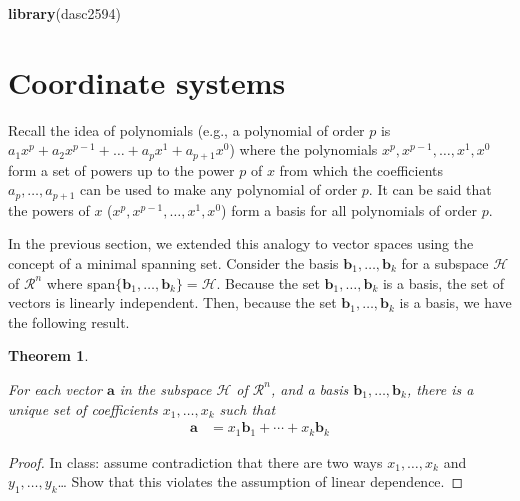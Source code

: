 \documentclass[
]{book}
\newenvironment{Shaded}{\begin{snugshade}}{\end{snugshade}}
\newcommand{\KeywordTok}[1]{\textcolor[rgb]{0.13,0.29,0.53}{\textbf{#1}}}
\newcommand{\NormalTok}[1]{#1}
\newtheorem{theorem}{Theorem}[chapter]
\theoremstyle{definition}
\theoremstyle{definition}
\theoremstyle{definition}
\theoremstyle{remark}
\begin{document}
\begin{Shaded}
\begin{Highlighting}[]
\KeywordTok{library}\NormalTok{(dasc2594)}
\end{Highlighting}
\end{Shaded}

\hypertarget{coordinate-systems}{%
\section{Coordinate systems}\label{coordinate-systems}}

Recall the idea of polynomials (e.g., a polynomial of order \(p\) is \(a_1x^p + a_2x^{p-1} + \ldots + a_p x^1 + a_{p+1} x^0\)) where the polynomials \(x^p, x^{p-1}, \ldots, x^1, x^0\) form a set of powers up to the power \(p\) of \(x\) from which the coefficients \(a_p, \ldots, a_{p+1}\) can be used to make any polynomial of order \(p\). It can be said that the powers of \(x\) (\(x^p, x^{p-1}, \ldots, x^1, x^0\)) form a basis for all polynomials of order \(p\).

In the previous section, we extended this analogy to vector spaces using the concept of a minimal spanning set. Consider the basis \(\mathbf{b}_1, \ldots, \mathbf{b}_k\) for a subspace \(\mathcal{H}\) of \(\mathcal{R}^n\) where span\(\{\mathbf{b}_1, \ldots, \mathbf{b}_k\} = \mathcal{H}\). Because the set \(\mathbf{b}_1, \ldots, \mathbf{b}_k\) is a basis, the set of vectors is linearly independent. Then, because the set \(\mathbf{b}_1, \ldots, \mathbf{b}_k\) is a basis, we have the following result.

\begin{theorem}
\protect\hypertarget{thm:unlabeled-div-94}{}\label{thm:unlabeled-div-94}

For each vector \(\mathbf{a}\) in the subspace \(\mathcal{H}\) of \(\mathcal{R}^n\), and a basis \(\mathbf{b}_1, \ldots, \mathbf{b}_k\), there is a unique set of coefficients \(x_1, \ldots, x_k\) such that
\[
\begin{aligned}
\mathbf{a} & = x_1 \mathbf{b}_1 + \cdots + x_k \mathbf{b}_k
\end{aligned}
\]

\end{theorem}

\begin{proof}

In class: assume contradiction that there are two ways \(x_1, \ldots, x_k\) and \(y_1, \ldots, y_k\)\ldots{} Show that this violates the assumption of linear dependence.

\end{proof}
\end{document}
